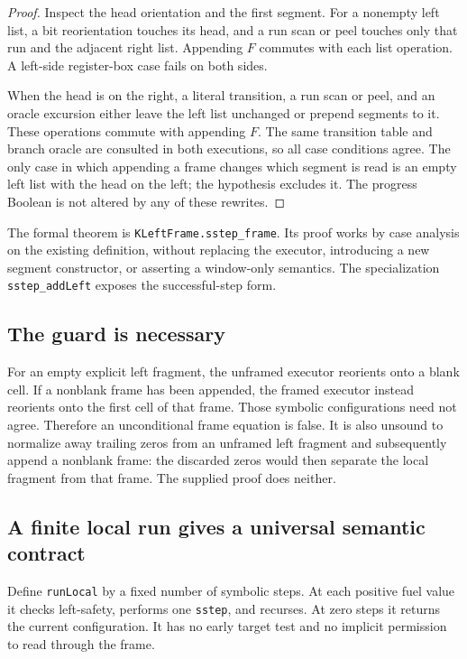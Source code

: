 \documentclass[11pt,letterpaper]{article}
\theoremstyle{definition}
\theoremstyle{remark}
\newcommand{\code}[1]{\texttt{#1}}
\begin{document}
\begin{proof}
Inspect the head orientation and the first segment. For a nonempty left
list, a bit reorientation touches its head, and a run scan or peel touches
only that run and the adjacent right list. Appending $F$ commutes with each
list operation. A left-side register-box case fails on both sides.

When the head is on the right, a literal transition, a run scan or peel,
and an oracle excursion either leave the left list unchanged or prepend
segments to it. These operations commute with appending $F$. The same
transition table and branch oracle are consulted in both executions, so all
case conditions agree. The only case in which appending a frame changes
which segment is read is an empty left list with the head on the left;
the hypothesis excludes it. The progress Boolean is not altered by any
of these rewrites.
\end{proof}

The formal theorem is \code{KLeftFrame.sstep\_frame}. Its proof works by
case analysis on the existing definition, without replacing the executor,
introducing a new segment constructor, or asserting a window-only semantics.
The specialization \code{sstep\_addLeft} exposes the successful-step form.

\subsection{The guard is necessary}

For an empty explicit left fragment, the unframed executor reorients onto
a blank cell. If a nonblank frame has been appended, the framed executor
instead reorients onto the first cell of that frame. Those symbolic
configurations need not agree. Therefore an unconditional frame equation is
false. It is also unsound to normalize away trailing zeros from an unframed
left fragment and subsequently append a nonblank frame: the discarded zeros
would then separate the local fragment from that frame. The supplied proof
does neither.

\subsection{A finite local run gives a universal semantic contract}

Define \code{runLocal} by a fixed number of symbolic steps. At each positive
fuel value it checks left-safety, performs one \code{sstep}, and recurses.
At zero steps it returns the current configuration. It has no early target
test and no implicit permission to read through the frame.
\end{document}
